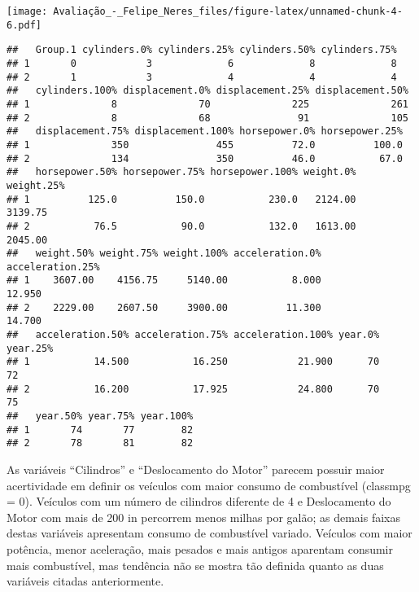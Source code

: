 \documentclass[]{article}
\newenvironment{Shaded}{\begin{snugshade}}{\end{snugshade}}
\newcommand{\KeywordTok}[1]{\textcolor[rgb]{0.13,0.29,0.53}{\textbf{#1}}}
\newcommand{\DecValTok}[1]{\textcolor[rgb]{0.00,0.00,0.81}{#1}}
\newcommand{\OperatorTok}[1]{\textcolor[rgb]{0.81,0.36,0.00}{\textbf{#1}}}
\newcommand{\NormalTok}[1]{#1}
\begin{document}
\texttt{[image: Avaliação\_-\_Felipe\_Neres\_files/figure-latex/unnamed-chunk-4-6.pdf]}

\begin{Shaded}
\end{Shaded}

\begin{verbatim}
##   Group.1 cylinders.0% cylinders.25% cylinders.50% cylinders.75%
## 1       0            3             6             8             8
## 2       1            3             4             4             4
##   cylinders.100% displacement.0% displacement.25% displacement.50%
## 1              8              70              225              261
## 2              8              68               91              105
##   displacement.75% displacement.100% horsepower.0% horsepower.25%
## 1              350               455          72.0          100.0
## 2              134               350          46.0           67.0
##   horsepower.50% horsepower.75% horsepower.100% weight.0% weight.25%
## 1          125.0          150.0           230.0   2124.00    3139.75
## 2           76.5           90.0           132.0   1613.00    2045.00
##   weight.50% weight.75% weight.100% acceleration.0% acceleration.25%
## 1    3607.00    4156.75     5140.00           8.000           12.950
## 2    2229.00    2607.50     3900.00          11.300           14.700
##   acceleration.50% acceleration.75% acceleration.100% year.0% year.25%
## 1           14.500           16.250            21.900      70       72
## 2           16.200           17.925            24.800      70       75
##   year.50% year.75% year.100%
## 1       74       77        82
## 2       78       81        82
\end{verbatim}

As variáveis ``Cilindros'' e ``Deslocamento do Motor'' parecem possuir
maior acertividade em definir os veículos com maior consumo de
combustível (classmpg = 0). Veículos com um número de cilindros
diferente de 4 e Deslocamento do Motor com mais de 200 in percorrem
menos milhas por galão; as demais faixas destas variáveis apresentam
consumo de combustível variado. Veículos com maior potência, menor
aceleração, mais pesados e mais antigos aparentam consumir mais
combustível, mas tendência não se mostra tão definida quanto as duas
variáveis citadas anteriormente.
\end{document}
